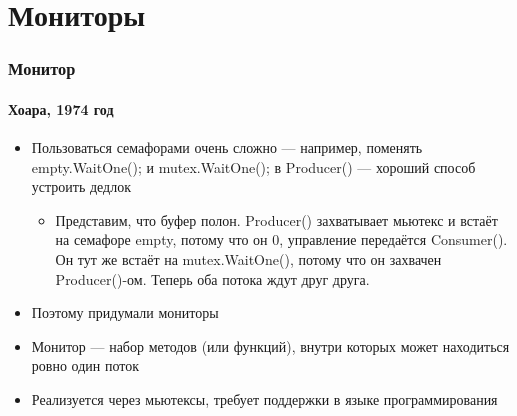 \documentclass[xetex,mathserif,serif]{beamer}
\begin{document}
    \section{Мониторы}

    \begin{frame}
        \frametitle{Монитор}
        \framesubtitle{Хоара, 1974 год}
        \begin{itemize}
            \item Пользоваться семафорами очень сложно --- например, поменять empty.WaitOne(); и mutex.WaitOne(); в Producer() --- хороший способ устроить дедлок
            \begin{itemize}
                \item Представим, что буфер полон. Producer() захватывает мьютекс и встаёт на семафоре empty, потому что он 0, управление передаётся Consumer(). Он тут же встаёт на mutex.WaitOne(), потому что он захвачен Producer()-ом. Теперь оба потока ждут друг друга.
            \end{itemize}
            \item Поэтому придумали мониторы
            \item Монитор --- набор методов (или функций), внутри которых может находиться ровно один поток
            \item Реализуется через мьютексы, требует поддержки в языке программирования
        \end{itemize}
    \end{frame}
\end{document}
